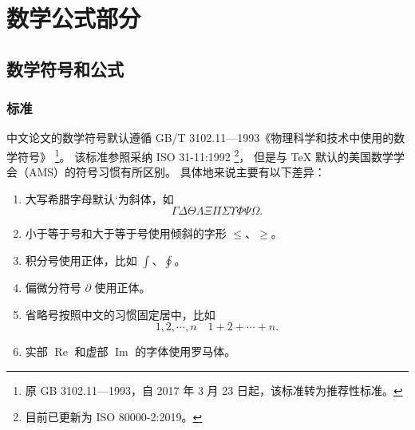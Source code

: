 
\chapter{数学公式部分}
\section{数学符号和公式}
\subsection{标准}
中文论文的数学符号默认遵循 GB/T 3102.11—1993《物理科学和技术中使用的数学符号》
\footnote{原 GB 3102.11—1993，自 2017 年 3 月 23 日起，该标准转为推荐性标准。}。
该标准参照采纳 ISO 31-11:1992 \footnote{目前已更新为 ISO 80000-2:2019。}，
但是与 \TeX{} 默认的美国数学学会（AMS）的符号习惯有所区别。
具体地来说主要有以下差异：
\begin{enumerate}
	\item 
	大写希腊字母默认`为斜体，如
	\begin{equation*}
		\varGamma \varDelta \varTheta \varLambda \varXi \varPi \varSigma \varUpsilon \varPhi \varPsi \varOmega.
	\end{equation*}
	\item 小于等于号和大于等于号使用倾斜的字形 $\le$、$\ge$。
	\item 积分号使用正体，比如 $\int$、$\oint$。
	\item
	偏微分符号 $\partial$ 使用正体。
	\item
	省略号按照中文的习惯固定居中，比如
	\begin{equation*}
		1, 2, \cdots, n \quad 1 + 2 + \cdots + n.
	\end{equation*}
	\item
	实部 $\operatorname{Re}$ 和虚部 $\operatorname{Im}$ 的字体使用罗马体。
\end{enumerate}





